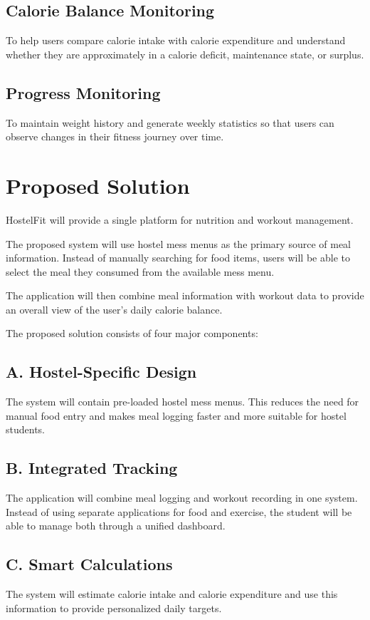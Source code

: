 \documentclass[11pt,a4paper]{article}
\begin{document}
\subsection{Calorie Balance Monitoring}
To help users compare calorie intake with calorie expenditure and understand whether they are approximately in a calorie deficit, maintenance state, or surplus.

\subsection{Progress Monitoring}
To maintain weight history and generate weekly statistics so that users can observe changes in their fitness journey over time.

\section{Proposed Solution}

HostelFit will provide a single platform for nutrition and workout management.

The proposed system will use hostel mess menus as the primary source of meal information. Instead of manually searching for food items, users will be able to select the meal they consumed from the available mess menu.

The application will then combine meal information with workout data to provide an overall view of the user's daily calorie balance.

The proposed solution consists of four major components:

\subsection*{A. Hostel-Specific Design}
The system will contain pre-loaded hostel mess menus. This reduces the need for manual food entry and makes meal logging faster and more suitable for hostel students.

\subsection*{B. Integrated Tracking}
The application will combine meal logging and workout recording in one system. Instead of using separate applications for food and exercise, the student will be able to manage both through a unified dashboard.

\subsection*{C. Smart Calculations}
The system will estimate calorie intake and calorie expenditure and use this information to provide personalized daily targets.
\end{document}
